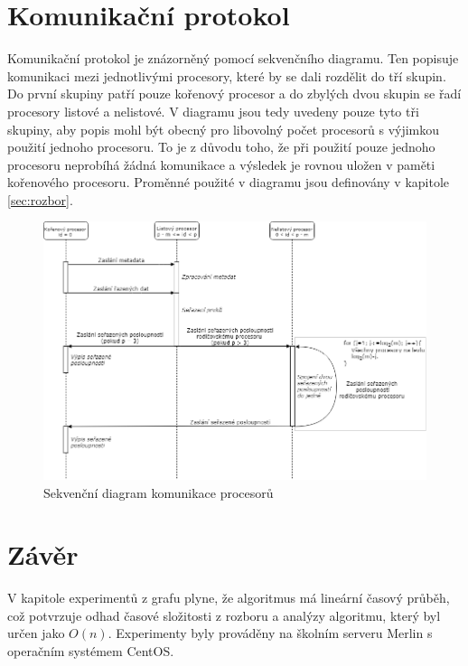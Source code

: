 \documentclass[12pt, a4paper]{article}
\begin{document}
\section{Komunikační protokol}
Komunikační protokol je znázorněný pomocí sekvenčního diagramu. Ten popisuje komunikaci mezi jednotlivými procesory, které by se dali rozdělit do tří skupin. Do první skupiny patří pouze kořenový procesor a do zbylých dvou skupin se řadí procesory listové a nelistové. V diagramu jsou tedy uvedeny pouze tyto tři skupiny, aby popis mohl být obecný pro libovolný počet procesorů s výjimkou použití jednoho procesoru. To je z důvodu toho, že při použití pouze jednoho procesoru neprobíhá žádná komunikace a výsledek je rovnou uložen v paměti kořenového procesoru. Proměnné použité v diagramu jsou definovány v kapitole \ref{sec:rozbor}.

\begin{figure}[H]
	\centering
	\includegraphics[scale=0.53]{pics/seq.png}
	\caption{Sekvenční diagram komunikace procesorů}	
\end{figure}


\section{Závěr}
V kapitole experimentů z grafu plyne, že algoritmus má lineární časový průběh, což potvrzuje odhad časové složitosti z rozboru a analýzy algoritmu, který byl určen jako $O(n)$. Experimenty byly prováděny na školním serveru Merlin s operačním systémem CentOS.
\end{document}
